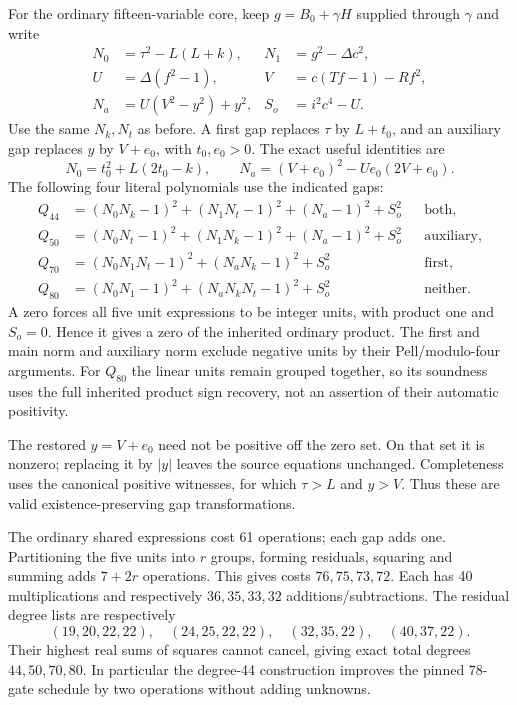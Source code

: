 \documentclass[11pt]{article}
\begin{document}
For the ordinary fifteen-variable core, keep $g=B_0+\gamma H$ supplied through $\gamma$ and write
\begin{align*}
 N_0&=\tau^2-L(L+k),&N_1&=g^2-\Delta c^2,\\
 U&=\Delta(f^2-1),& V&=c(Tf-1)-Rf^2,\\
 N_a&=U(V^2-y^2)+y^2,&S_o&=i^2c^4-U.
\end{align*}
Use the same $N_k,N_t$ as before. A first gap replaces $\tau$ by $L+t_0$, and an auxiliary gap replaces $y$ by $V+e_0$, with $t_0,e_0>0$. The exact useful identities are
\[
 N_0=t_0^2+L(2t_0-k),\qquad
 N_a=(V+e_0)^2-Ue_0(2V+e_0).
\]
The following four literal polynomials use the indicated gaps:
\begin{align*}
 Q_{44}&=(N_0N_k-1)^2+(N_1N_t-1)^2+(N_a-1)^2+S_o^2
 &&\text{both},\\
 Q_{50}&=(N_0N_t-1)^2+(N_1N_k-1)^2+(N_a-1)^2+S_o^2
 &&\text{auxiliary},\\
 Q_{70}&=(N_0N_1N_t-1)^2+(N_aN_k-1)^2+S_o^2
 &&\text{first},\\
 Q_{80}&=(N_0N_1-1)^2+(N_aN_kN_t-1)^2+S_o^2
 &&\text{neither}.
\end{align*}
A zero forces all five unit expressions to be integer units, with product one and $S_o=0$. Hence it gives a zero of the inherited ordinary product. The first and main norm and auxiliary norm exclude negative units by their Pell/modulo-four arguments. For $Q_{80}$ the linear units remain grouped together, so its soundness uses the full inherited product sign recovery, not an assertion of their automatic positivity.

The restored $y=V+e_0$ need not be positive off the zero set. On that set it is nonzero; replacing it by $|y|$ leaves the source equations unchanged. Completeness uses the canonical positive witnesses, for which $\tau>L$ and $y>V$. Thus these are valid existence-preserving gap transformations.

The ordinary shared expressions cost 61 operations; each gap adds one. Partitioning the five units into $r$ groups, forming residuals, squaring and summing adds $7+2r$ operations. This gives costs $76,75,73,72$. Each has 40 multiplications and respectively $36,35,33,32$ additions/subtractions. The residual degree lists are respectively
\[
 (19,20,22,22),\quad(24,25,22,22),\quad(32,35,22),\quad(40,37,22).
\]
Their highest real sums of squares cannot cancel, giving exact total degrees $44,50,70,80$. In particular the degree-44 construction improves the pinned 78-gate schedule by two operations without adding unknowns.
\end{document}
